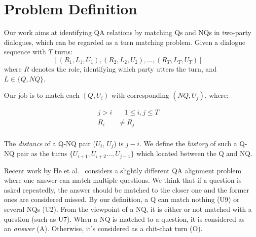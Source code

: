\section{Problem Definition}
\label{sec:problem}
Our work aims at identifying QA relations by matching Qs and NQs in two-party dialogues, which can be regarded as a turn matching problem. Given a dialogue sequence with $T$ turns: 
$$[(R_1,L_1,U_1),(R_2,L_2,U_2),...,(R_T,L_T,U_T)]$$ 
where $R$ denotes the role, identifying which party utters
the turn, and $L\in\{Q, NQ\}$. 

Our job is to match each $(Q, U_i)$ with corresponding $(NQ, U_j)$, where:

\begin{equation}
\begin{aligned}
j>i&\quad 1\leq i,j\leq T\\
R_i&\not=R_j\\
\end{aligned}
\end{equation}

The {\em distance} of a Q-NQ pair ($U_i$, $U_j$) is $j-i$. We define
the {\em history} of such a Q-NQ pair as the turns 
$\{U_{i+1},U_{i+2}...,U_{j-1}\}$ which located between the Q and NQ.

Recent work by He et al.~ considers a slightly different QA alignment problem where one answer can match multiple questions. We think that if a question is asked repeatedly, the answer should be matched to the closer one and the former ones are considered missed. By our definition, a Q can match nothing (U9) or several NQs (U2). From the viewpoint of a NQ, it is either or not matched with a question (such as U7). When a NQ is matched to a question, it is 
considered as an {\em answer} (A). Otherwise, it's considered as a chit-chat turn
(O).




